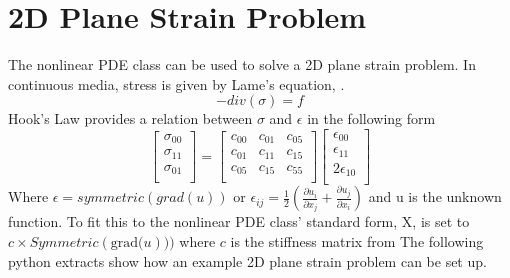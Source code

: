\section{2D Plane Strain Problem}
The nonlinear PDE class can be used to solve a 2D plane strain problem. In continuous media, stress is given by Lame's equation, .
\begin{equation} 
-div(\sigma)=f
\label{symbolic eq2}
\end{equation} 
Hook's Law provides a relation between $\sigma$ and $\epsilon$ in the following form
\begin{equation}
\left[ \begin{array}{c}
\sigma_{00} \\
\sigma_{11} \\
\sigma_{01} \\
\end{array} \right] = 
\left[ \begin{array}{ccc}
c_{00} & c_{01} & c_{05}\\
c_{01} & c_{11} & c_{15}\\
c_{05} & c_{15} & c_{55}\\
\end{array}\right]
\left[ \begin{array}{c}
\epsilon_{00} \\
\epsilon_{11} \\
2\epsilon_{10} \\
\end{array} \right]
\label{symbolic eq3}
\end{equation}
Where $\epsilon = symmetric(grad(u)) \text{ or } \epsilon_{ij}=\frac{1}{2}\left(\frac{\partial u_i}{\partial x_j} + {\frac{\partial u_j}{\partial x_i}}\right)$ and 
u is the unknown function. To fit this to the nonlinear PDE class' standard form, X, is set to $c \times Symmetric(\text{grad(}u)))$ where $c$ is the stiffness matrix from 
The following python extracts show how an example 2D plane strain problem can be set up. 

